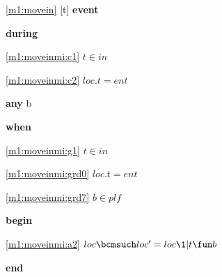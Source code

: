 \noindent \ref{m1:movein} [t] \textbf{event}
\begin{block}
  \item   \textbf{during}
  \begin{block}
  \item[ \eqref{m1:moveinmi:c1} ]$t \in in $ %
  \item[ \eqref{m1:moveinmi:c2} ]$loc.t = ent $ %
  \end{block}
  \item   \textbf{any} b
  \item   \textbf{when}
  \begin{block}
  \item[ \eqref{m1:moveinmi:g1} ]$t \in in $ %
  \item[ \eqref{m1:moveinmi:grd0} ]$loc.t = ent $ %
  \item[ \eqref{m1:moveinmi:grd7} ]$b \in plf $ %
  \end{block}
  \item   \textbf{begin}
  \begin{block}
  \item[ \eqref{m1:moveinmi:a2} ]$loc \bcmsuch loc' = loc \1| t \fun b $ %
  \end{block}
  \item   \textbf{end} \\
\end{block}
